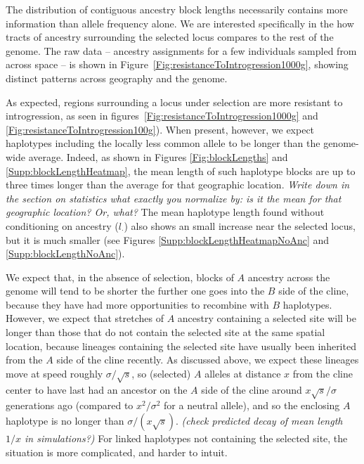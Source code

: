 \documentclass[11pt,letterpaper]{article}
\newcommand{\plr}[1]{{\em \color{blue} #1}}
\begin{document}
The distribution of contiguous ancestry block lengths necessarily contains more information than allele frequency alone. We are interested specifically in the how tracts of ancestry surrounding the selected locus compares to the rest of the genome. 
The raw data -- ancestry assignments for a few individuals sampled from across space --
is shown in Figure~\ref{Fig:resistanceToIntrogression1000g},
showing distinct patterns across geography and the genome.

As expected, regions surrounding a locus under selection are more resistant to introgression,
as seen in figures~\ref{Fig:resistanceToIntrogression1000g} and \ref{Fig:resistanceToIntrogression100g}).
When present, however, we expect haplotypes including the locally less common allele
to be longer than the genome-wide average.
Indeed,
as shown in Figures \ref{Fig:blockLengths} and \ref{Supp:blockLengthHeatmap},
the mean length of such haplotype blocks are up to three times longer
than the average for that geographic location.
\plr{Write down in the section on statistics what exactly you normalize by:
is it the mean for that geographic location?  Or, what?}
The mean haplotype length found without conditioning on ancestry ($l_\cdot$)
also shows an small increase near the selected locus,
but it is much smaller (see Figures \ref{Supp:blockLengthHeatmapNoAnc} and \ref{Supp:blockLengthNoAnc}).

We expect that, in the absence of selection, blocks of $A$ ancestry across the genome 
will tend to be shorter the further one goes into the $B$ side of the cline,
because they have had more opportunities to recombine with $B$ haplotypes. 
However, we expect that stretches of $A$ ancestry containing a selected site will be longer
than those that do not contain the selected site at the same spatial location,
because lineages containing the selected site have usually been inherited from the $A$ side of the cline recently. 
As discussed above, we expect these lineages move at speed roughly $\sigma/\sqrt{s}$,
so (selected) $A$ alleles at distance $x$ from the cline center
to have last had an ancestor on the $A$ side of the cline around $x \sqrt{s}/\sigma$ generations ago 
(compared to $x^2/\sigma^2$ for a neutral allele),
and so the enclosing $A$ haplotype is no longer than $\sigma/(x \sqrt{s})$.
\plr{(check predicted decay of mean length $1/x$ in simulations?)}
For linked haplotypes not containing the selected site, the situation is more complicated, and harder to intuit.
\end{document}

